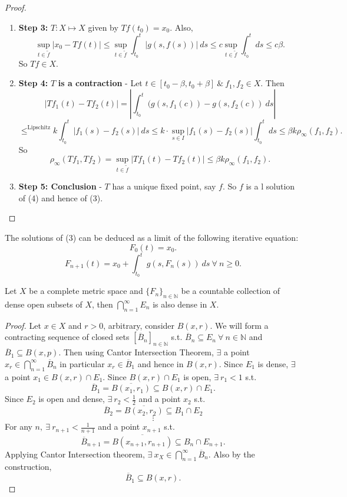 \documentclass{functionspaces}
\begin{document}
\begin{enumerate}
\begin{proof}
\begin{enumerate}
\item[(c)] \textbf{Step 3:} $T:X\mapsto X$ given by $Tf(t_{0})=x_{0}$. Also,
\[
\sup_{t\in\tilde{f}}|x_{0}-Tf(t)|\leq\sup_{t\in\tilde{f}}\int_{t_{0}}^{t}|g(s,f(s))|\ ds\leq c\sup_{t\in\tilde{f}}\int_{t_{0}}^{t}ds\leq c\beta.
\]
So $Tf\in X$.

\item[(d)] \textbf{Step 4:} $T$ \textbf{is a contraction} - Let $t\in[t_{0}-\beta,t_{0}+\beta]\ \&\ f_{1},f_{2}\in X$. Then
\[
|Tf_{1}(t)-Tf_{2}(t)|=\left|\int_{t_{0}}^{t}(g(s,f_{1}(c))-g(s,f_{2}(c))\ ds\right|
\]
\[
\leq^{\text{Lipschitz}}k\int_{t_{0}}^{t}|f_{1}(s)-f_{2}(s)|\ ds\leq k\cdot\sup_{s\in I}|f_{1}(s)-f_{2}(s)|\int_{t_{0}}^{t}ds\leq\beta k\rho_{\infty}(f_{1},f_{2}).
\]
So
\[
\rho_{\infty}(Tf_{1},Tf_{2})=\sup_{t\in\tilde{f}}|Tf_{1}(t)-Tf_{2}(t)|\leq\beta k\rho_{\infty}(f_{1},f_{2}).
\]

\item[(e)] \textbf{Step 5: Conclusion} - $T$ has a unique fixed point, say $f$. So $f$ is a l solution of (4) and hence of (3).
\end{enumerate}
\end{proof}

\begin{corollary}
The solutions of (3) can be deduced as a limit of the following iterative equation:
\[
F_{0}(t)=x_{0}.
\]
\[
F_{n+1}(t)=x_{0}+\int_{t_{0}}^{t}g(s,F_{n}(s))\ ds\ \forall\ n\geq 0.
\]
\end{corollary}
\end{enumerate}

\begin{theorem}
Let $X$ be a complete metric space and $\{F_{n}\}_{n\in\mathbb{N}}$ be a countable collection of dense open subsets of $X$, then $\bigcap_{n=1}^{\infty}E_{n}$ is also dense in $X$.
\end{theorem}

\begin{proof}
Let $x\in X$ and $r>0$, arbitrary, consider $B(x,r)$. We will form a contracting sequence of closed sets $\left[\overline{B}_{n}\right]_{n\in\mathbb{N}}$ s.t. $\overline{B}_{n}\subseteq E_{n}\ \forall\ n\in\mathbb{N}$ and $\overline{B}_{1}\subseteq B(x,p)$. Then using Cantor Intersection Theorem, $\exists$ a point $x_{r}\in\bigcap_{n=1}^{\infty}\overline{B}_{n}$ in particular $x_{r}\in\overline{B}_{1}$ and hence in $B(x,r)$. Since $E_{1}$ is dense, $\exists$ a point $x_{1}\in B(x,r)\cap E_{1}$. Since $B(x,r)\cap E_{1}$ is open, $\exists\ r_{1}<1$ s.t.
\[
\overline{B}_{1}=\overline{B(x_{1},r_{1})}\subseteq B(x,r)\cap E_{1}.
\]
Since $E_{2}$ is open and dense, $\exists\ r_{2}<\frac{1}{2}$ and a point $x_{2}$ s.t.
\[
\overline{B}_{2}=\overline{B(x_{2},r_{2})}\subseteq B_{1}\cap E_{2}
\]
\[
\vdots
\]
For any $n,\ \exists\ r_{n+1}<\frac{1}{n+1}$ and a point $x_{n+1}$ s.t.
\[
\overline{B}_{n+1}=\overline{B(x_{n+1},r_{n+1})}\subseteq B_{n}\cap E_{n+1}.
\]
Applying Cantor Intersection theorem, $\exists\ x_{X}\in\bigcap_{n=1}^{\infty}\overline{B}_{n}$. Also by the construction,
\[
\overline{B}_{1}\subseteq B(x,r).
\]
\end{proof}
\end{document}
